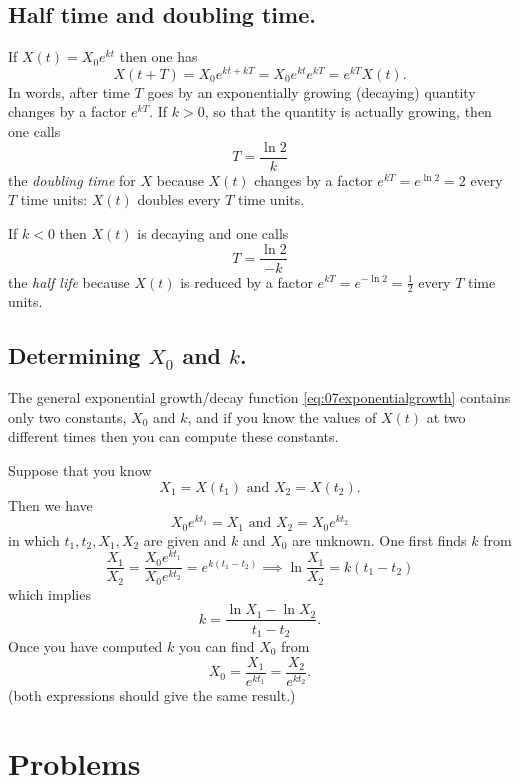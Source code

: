 \subsection{Half time and doubling time. }
If $X(t) = X_0 e^{kt}$ then one has
\[
X(t+T) = X_0e^{kt+kT} = X_0e^{kt}e^{kT} = e^{kT}X(t).
\]
In words, after time $T$ goes by an exponentially growing (decaying) quantity
changes by a factor $e^{kT}$.  If $k>0$, so that the quantity is actually
growing, then one calls
\[
T = \frac{\ln 2}{k}
\]
the \emph{doubling time} for $X$ because $X(t)$ changes by a factor $e^{kT} =
e^{\ln2} = 2$ every $T$ time units:  $X(t)$ doubles every $T$ time units.

If $k<0$ then $X(t)$ is decaying and one calls
\[
T = \frac{\ln 2}{-k}
\]
the \emph{half life} because $X(t)$ is reduced by a factor $e^{kT} = e^{-\ln 2}
= \frac12$ every $T$ time units.

\subsection{Determining $X_0$ and $k$. }
The general exponential growth/decay function \eqref {eq:07exponentialgrowth}
contains only two constants, $X_0$ and $k$, and if you know the values of $X(t)$
at two different times then you can compute these constants.

Suppose that you know 
\[
X_1 = X(t_1) \text{ and } X_2=X(t_2).
\]
Then we have
\[
X_0e^{kt_1} = X_1 \text{ and } X_2 = X_0e^{kt_2}
\]
in which $t_1, t_2, X_1, X_2$ are given and $k$ and $X_0$ are unknown.  
One first finds $k$ from
\[
\frac{X_1}{X_2}= \frac{X_0e^{kt_1}}{X_0e^{kt_2}}
=e^{k(t_1-t_2)}
\implies \ln\frac{X_1}{X_2}= k(t_1-t_2)
\]
which implies
\[
k = \frac{\ln X_1 - \ln X_2}{t_1-t_2}.
\]
Once you have computed $k$ you can find $X_0$ from
\[
X_0 = \frac{X_1}{e^{kt_1}} = \frac{X_2}{e^{kt_2}}.
\]
(both expressions should give the same result.)




\section{Problems}
\problemfont

